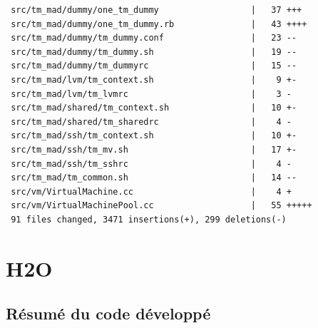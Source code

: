 \begin{lstlisting}
 src/tm_mad/dummy/one_tm_dummy                  |   37 +++
 src/tm_mad/dummy/one_tm_dummy.rb               |   43 ++++
 src/tm_mad/dummy/tm_dummy.conf                 |   23 --
 src/tm_mad/dummy/tm_dummy.sh                   |   19 --
 src/tm_mad/dummy/tm_dummyrc                    |   15 --
 src/tm_mad/lvm/tm_context.sh                   |    9 +-
 src/tm_mad/lvm/tm_lvmrc                        |    3 -
 src/tm_mad/shared/tm_context.sh                |   10 +-
 src/tm_mad/shared/tm_sharedrc                  |    4 -
 src/tm_mad/ssh/tm_context.sh                   |   10 +-
 src/tm_mad/ssh/tm_mv.sh                        |   17 +-
 src/tm_mad/ssh/tm_sshrc                        |    4 -
 src/tm_mad/tm_common.sh                        |   14 --
 src/vm/VirtualMachine.cc                       |    4 +
 src/vm/VirtualMachinePool.cc                   |   55 +++++
 91 files changed, 3471 insertions(+), 299 deletions(-)
\end{lstlisting}

\chapter{H2O}

\section{Résumé du code développé}

